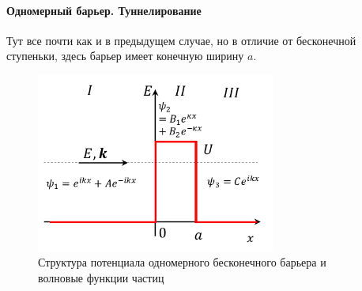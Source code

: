 \documentclass[12pt]{article}
\begin{document}
\paragraph{Одномерный барьер. Туннелирование}
Тут все почти как и в предыдущем случае, но в отличие от бесконечной ступеньки, здесь барьер имеет конечную ширину $a$. 

\begin{figure}[h]
    \centering
    \includegraphics[width=0.7\textwidth,height=\textheight,keepaspectratio]{Seminar_04/pics/pic_02.pdf}
    \caption{Структура потенциала одномерного бесконечного барьера и волновые функции частиц}
    \label{fig:sem_04}
\end{figure}
\end{document}
